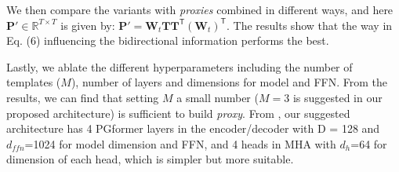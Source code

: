 \documentclass[10pt,twocolumn,letterpaper]{article}
\begin{document}
We then compare the variants with \textit{proxies} combined in different ways, and here $\bm{P}' \in \mathbb{R}^{T \times T}$  is given by: $\bm{P}' = \bm{W}_t  \bm{T} \bm{T}^{\mathsf{T}} (\bm{W}_t)^{\mathsf{T}}.$
The results show that the way in Eq. (6) influencing the bidirectional information performs the best. 


Lastly, we ablate the different hyperparameters including the number of templates ($M$), number of layers and dimensions for model and FFN.
From the results, we can find that setting $M$ a small number ($M=3$ is suggested in our proposed architecture) is sufficient to build \textit{proxy}. 
From , our suggested architecture has 4 PGformer layers in the encoder/decoder with D = 128 and $d_{ffn}$=1024 for model dimension and FFN, and 4 heads in MHA with $d_h$=64 for dimension of each head, which is simpler but more suitable. 
\end{document}
